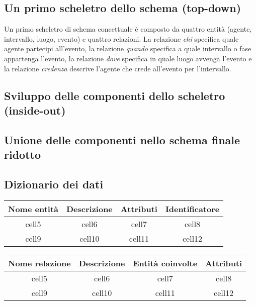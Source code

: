 \documentclass{article}
\begin{document}
\subsection{Un primo scheletro dello schema (top-down)}
Un primo scheletro di schema concettuale è composto da quattro entità (agente,
intervallo, luogo, evento) e quattro relazioni. La relazione \emph{chi}
specifica quale agente partecipi all'evento, la relazione \emph{quando}
specifica a quale intervallo o fase appartenga l'evento, la relazione
\emph{dove} specifica in quale luogo avvenga l'evento e la relazione
\emph{credenza} descrive l'agente che crede all'evento per l'intervallo.
\subsection{Sviluppo delle componenti dello scheletro (inside-out)}

\subsection{Unione delle componenti nello schema finale ridotto}

\subsection{Dizionario dei dati}

\begin{center}\begin{tabular}{ |c|c|c|c| }
		\hline
		\textbf{Nome entità} & \textbf{Descrizione} & \textbf{Attributi} & \textbf{Identificatore} \\
		\hline
		cell5                & cell6                & cell7              & cell8                   \\
		\hline
		cell9                & cell10               & cell11             & cell12                  \\
		\hline
	\end{tabular}\end{center}

\begin{center}\begin{tabular}{ |c|c|c|c| }
		\hline
		\textbf{Nome relazione} & \textbf{Descrizione} & \textbf{Entità coinvolte} & \textbf{Attributi} \\
		\hline
		cell5                   & cell6                & cell7                     & cell8              \\
		\hline
		cell9                   & cell10               & cell11                    & cell12             \\
		\hline
	\end{tabular}\end{center}
\end{document}
